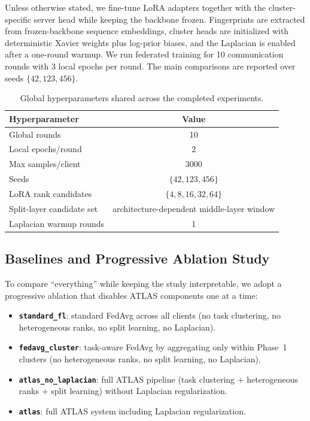 \documentclass[conference]{IEEEtran}
\begin{document}
Unless otherwise stated, we fine-tune LoRA adapters together with the cluster-specific server head while keeping the backbone frozen. Fingerprints are extracted from frozen-backbone sequence embeddings, cluster heads are initialized with deterministic Xavier weights plus log-prior biases, and the Laplacian is enabled after a one-round warmup. We run federated training for 10 communication rounds with 3 local epochs per round. The main comparisons are reported over seeds $\{42, 123, 456\}$.

\begin{table}[t]
\centering
\caption{Global hyperparameters shared across the completed experiments.}
\label{tab:training_hparams}
\begin{tabular}{lc}
\toprule
\textbf{Hyperparameter} & \textbf{Value} \\
\midrule
Global rounds & 10 \\
Local epochs/round & 2 \\
Max samples/client & 3000 \\
Seeds & $\{42, 123, 456\}$ \\
LoRA rank candidates & $\{4,8,16,32,64\}$ \\
Split-layer candidate set & architecture-dependent middle-layer window \\
Laplacian warmup rounds & 1 \\
\bottomrule
\end{tabular}
\end{table}

\subsection{Baselines and Progressive Ablation Study}

To compare ``everything'' while keeping the study interpretable, we adopt a progressive ablation that disables ATLAS components one at a time:
\begin{itemize}
  \item \textbf{\texttt{standard\_fl}}: standard FedAvg across all clients (no task clustering, no heterogeneous ranks, no split learning, no Laplacian).
  \item \textbf{\texttt{fedavg\_cluster}}: task-aware FedAvg by aggregating only within Phase~1 clusters (no heterogeneous ranks, no split learning, no Laplacian).
  \item \textbf{\texttt{atlas\_no\_laplacian}}: full ATLAS pipeline (task clustering + heterogeneous ranks + split learning) without Laplacian regularization.
  \item \textbf{\texttt{atlas}}: full ATLAS system including Laplacian regularization.
\end{itemize}
\end{document}
